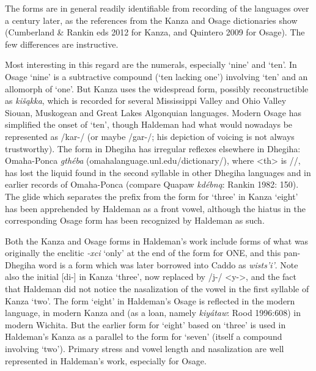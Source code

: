 \documentclass[output=paper]{LSP/langsci}
\begin{document}
The forms are in general readily identifiable from recording of the languages over a century later, as the references from the Kanza and Osage dictionaries show (Cumberland \& Rankin eds 2012 for Kanza, and Quintero 2009 for Osage). The few differences are instructive.    

Most interesting in this regard are the numerals, especially `nine' and `ten'.  In Osage `nine' is a subtractive compound (`ten lacking one') involving `ten' and an allomorph of `one'.  But  Kanza uses the widespread form, possibly reconstructible as \textit{ki\v{s}\k{a}kka}, which is recorded for several Mississippi Valley and Ohio Valley Siouan, Muskogean and Great Lakes Algonquian languages.   Modern Osage has simplified the onset of `ten', though Haldeman had what would nowadays be represented as /kar-/ (or maybe /gar-/; his depiction of voicing is not always trustworthy).  The form in Dhegiha has irregular reflexes elsewhere in Dhegiha:   Omaha-Ponca \textit{gth\'eba} (omahalanguage.unl.edu/dictionary/), where <th> is //, has lost the liquid found in the second syllable in other Dhegiha languages and in earlier records of Omaha-Ponca (compare Quapaw \textit{kd\'ebn\k{a}}: Rankin 1982: 150). The glide which separates the prefix from the form for `three' in Kanza `eight' has been apprehended by Haldeman as a front vowel, although the hiatus in the corresponding Osage form has been recognized by Haldeman as such.  

Both the Kanza and Osage forms in Haldeman's work include forms of what was originally the enclitic \textit{-xci} `only' at the end of the form for ONE, and this pan-Dhegiha word is a form which was later borrowed into Caddo as \textit{wists'i'}.  Note also the initial [di-] in Kanza `three', now replaced by /j-/ <y->, and the fact that Haldeman did not notice the nasalization of the vowel in the first syllable of Kanza `two'.  The form `eight' in Haldeman's Osage is reflected in the modern language, in modern Kanza and (as a loan, namely \textit{kiy\'ataw}: Rood 1996:608) in modern Wichita. But the earlier form for `eight' based on `three' is used in Haldeman's Kanza as a parallel to the form for `seven' (itself a compound involving `two'). Primary stress and vowel length and nasalization are well represented in Haldeman's work, especially for Osage.  
\end{document}

